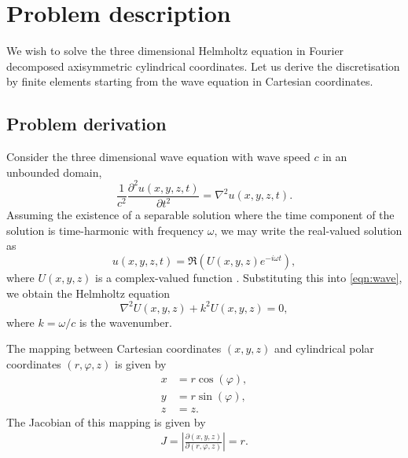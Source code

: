 \chapter{Problem description}
\label{sec:problem}

We wish to solve the three dimensional Helmholtz equation in Fourier decomposed axisymmetric cylindrical coordinates.
Let us derive the discretisation by finite elements starting from the wave equation in Cartesian coordinates.

\section{Problem derivation}

Consider the three dimensional wave equation with wave speed $c$ in an unbounded domain,
\begin{equation}
	\frac{1}{c^2} \frac{\partial^2 u(x,y,z,t)}{\partial t^2} = \nabla^2 u(x,y,z,t). \label{eqn:wave}
\end{equation}
Assuming the existence of a separable solution where the time component of the solution is time-harmonic with frequency $\omega$,
we may write the real-valued solution as
\[
	u(x,y,z,t) = \Re \left( U(x,y,z)e^{-i\omega t} \right),
\]
where $U(x,y,z)$ is a complex-valued function \cite{oomph_hh}.
Substituting this into \eqref{eqn:wave}, we obtain the Helmholtz equation
\begin{equation}
	\nabla^2 U(x,y,z) + k^2 U(x,y,z) = 0, \label{eqn:hh}
\end{equation}
where $k=\omega/c$ is the wavenumber.

The mapping between Cartesian coordinates $(x,y,z)$ and cylindrical polar coordinates $(r,\varphi,z)$ is given by
\begin{align}
	x &= r\cos(\varphi), \\
	y &= r\sin(\varphi), \\
	z &= z.
\end{align}
The Jacobian of this mapping is given by
\begin{align}
	J = \left\vert \frac{\partial(x,y,z)}{\partial(r,\varphi,z)} \right\vert = r.
\end{align}

